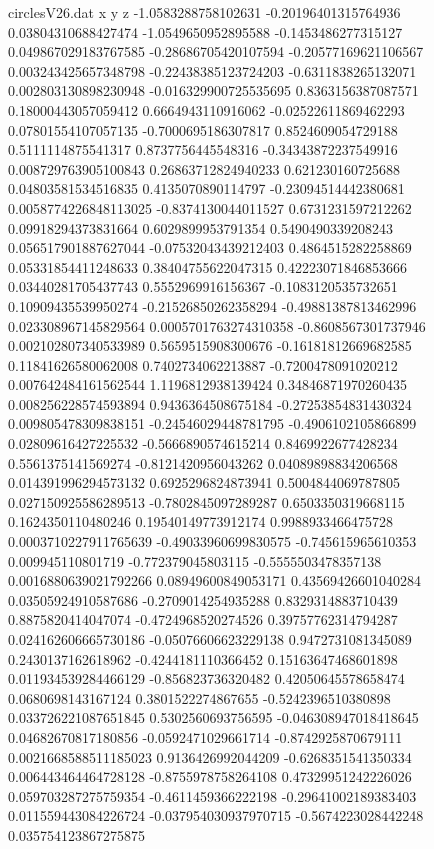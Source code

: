 \begin{filecontents}{circlesV26.dat}
x y z
-1.0583288758102631	-0.20196401315764936	0.03804310688427474
-1.0549650952895588	-0.1453486277315127	0.049867029183767585
-0.28686705420107594	-0.20577169621106567	0.003243425657348798
-0.22438385123724203	-0.6311838265132071	0.002803130898230948
-0.016329900725535695	0.8363156387087571	0.18000443057059412
0.6664943110916062	-0.02522611869462293	0.07801554107057135
-0.7000695186307817	0.8524609054729188	0.5111114875541317
0.8737756445548316	-0.34343872237549916	0.008729763905100843
0.26863712824940233	0.621230160725688	0.04803581534516835
0.4135070890114797	-0.23094514442380681	0.0058774226848113025
-0.8374130044011527	0.6731231597212262	0.09918294373831664
0.6029899953791354	0.5490490339208243	0.056517901887627044
-0.07532043439212403	0.4864515282258869	0.05331854411248633
0.38404755622047315	0.42223071846853666	0.03440281705437743
0.5552969916156367	-0.1083120535732651	0.10909435539950274
-0.21526850262358294	-0.49881387813462996	0.023308967145829564
0.0005701763274310358	-0.8608567301737946	0.002102807340533989
0.5659515908300676	-0.16181812669682585	0.11841626580062008
0.7402734062213887	-0.7200478091020212	0.007642484161562544
1.1196812938139424	0.34846871970260435	0.008256228574593894
0.9436364508675184	-0.27253854831430324	0.009805478309838151
-0.24546029448781795	-0.4906102105866899	0.02809616427225532
-0.5666890574615214	0.8469922677428234	0.5561375141569274
-0.8121420956043262	0.04089898834206568	0.014391996294573132
0.6925296824873941	0.5004844069787805	0.027150925586289513
-0.7802845097289287	0.6503350319668115	0.1624350110480246
0.19540149773912174	0.9988933466475728	0.0003710227911765639
-0.49033960699830575	-0.745615965610353	0.009945110801719
-0.772379045803115	-0.5555503478357138	0.0016880639021792266
0.08949600849053171	0.43569426601040284	0.03505924910587686
-0.2709014254935288	0.8329314883710439	0.8875820414047074
-0.4724968520274526	0.39757762314794287	0.024162606665730186
-0.05076606623229138	0.9472731081345089	0.2430137162618962
-0.4244181110366452	0.15163647468601898	0.011934539284466129
-0.856823736320482	0.42050645578658474	0.0680698143167124
0.3801522274867655	-0.5242396510380898	0.033726221087651845
0.5302560693756595	-0.046308947018418645	0.04682670817180856
-0.0592471029661714	-0.8742925870679111	0.0021668588511185023
0.9136426992044209	-0.6268351541350334	0.006443464464728128
-0.8755978758264108	0.47329951242226026	0.059703287275759354
-0.4611459366222198	-0.29641002189383403	0.011559443084226724
-0.037954030937970715	-0.5674223028442248	0.035754123867275875

\end{filecontents}
